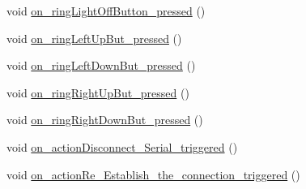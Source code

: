 \begin{DoxyCompactItemize}
void \mbox{\hyperlink{classMainWindow_ac5c8ca012c0b479ca3b42a172df11f99}{on\+\_\+ring\+Light\+Off\+Button\+\_\+pressed}} ()
\item 
void \mbox{\hyperlink{classMainWindow_aefd08ff26ec69cb1a8c2da298e414742}{on\+\_\+ring\+Left\+Up\+But\+\_\+pressed}} ()
\item 
void \mbox{\hyperlink{classMainWindow_a125980000dd5d0e94dfc612b0d911267}{on\+\_\+ring\+Left\+Down\+But\+\_\+pressed}} ()
\item 
void \mbox{\hyperlink{classMainWindow_a91f17268d2e2d4ac1b10c37a535a93fe}{on\+\_\+ring\+Right\+Up\+But\+\_\+pressed}} ()
\item 
void \mbox{\hyperlink{classMainWindow_a2a0d4d64e7fe2ee99abce8e41eb4afd1}{on\+\_\+ring\+Right\+Down\+But\+\_\+pressed}} ()
\item 
void \mbox{\hyperlink{classMainWindow_adac02082b520624b82e63d66eb2f1f57}{on\+\_\+action\+Disconnect\+\_\+\+Serial\+\_\+triggered}} ()
\item 
void \mbox{\hyperlink{classMainWindow_abe15cc441416a5266df8770298aca76b}{on\+\_\+action\+Re\+\_\+\+Establish\+\_\+the\+\_\+connection\+\_\+triggered}} ()
\end{DoxyCompactItemize}
